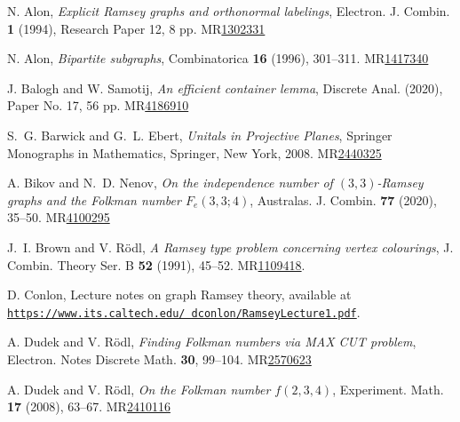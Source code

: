 \documentclass[A4paper,reqno,oneside,12pt]{amsart}
\theoremstyle{plain}
\theoremstyle{definition}
\begin{document}
\begin{thebibliography}{}

N. Alon, 
{\it Explicit Ramsey graphs and orthonormal labelings},
Electron. J. Combin. {\bf 1} (1994), Research Paper 12, 8 pp.
MR\href{https://mathscinet.ams.org/mathscinet/article?mr=1302331}{1302331}

N. Alon, 
{\it Bipartite subgraphs},
Combinatorica {\bf 16} (1996), 301--311.
MR\href{https://mathscinet.ams.org/mathscinet/article?mr=1417340}{1417340}

J. Balogh and W. Samotij, 
{\it An efficient container lemma}, 
Discrete Anal. (2020), Paper No. 17, 56 pp.
MR\href{https://mathscinet.ams.org/mathscinet/article?mr=4186910}{4186910}

S.~G. Barwick and G.~L. Ebert, {\it Unitals in Projective Planes}, Springer Monographs in Mathematics, Springer, New York, 2008.
MR\href{https://mathscinet.ams.org/mathscinet/article?mr=2440325}{2440325}

A. Bikov and N.~D. Nenov, 
{\it On the independence number of $(3,3)$-Ramsey graphs and the Folkman number $F_e(3,3;4)$},
Australas. J. Combin. {\bf 77} (2020), 35--50.
MR\href{https://mathscinet.ams.org/mathscinet/article?mr=4100295}{4100295}

J.~I. Brown and V. R\"odl, 
{\it A Ramsey type problem concerning vertex colourings},
J. Combin. Theory Ser. B {\bf 52} (1991), 45--52.
MR\href{https://mathscinet.ams.org/mathscinet/article?mr=1109418}{1109418}.


D. Conlon, Lecture notes on graph Ramsey theory,
available at\\
\href{https://www.its.caltech.edu/~dconlon/RamseyLecture1.pdf}{{\tt https://www.its.caltech.edu/~dconlon/RamseyLecture1.pdf}}.

A. Dudek and V. R\"odl, 
{\it Finding Folkman numbers via MAX CUT problem},
Electron. Notes Discrete Math. {\bf 30}, 99--104. 
MR\href{https://mathscinet.ams.org/mathscinet/article?mr=2570623}{2570623}

A. Dudek and V. R\"odl, 
{\it On the Folkman number $f(2,3,4)$},
Experiment. Math. {\bf 17} (2008), 63--67.
MR\href{https://mathscinet.ams.org/mathscinet/article?mr=2410116}{2410116}


\end{thebibliography}
\end{document}
